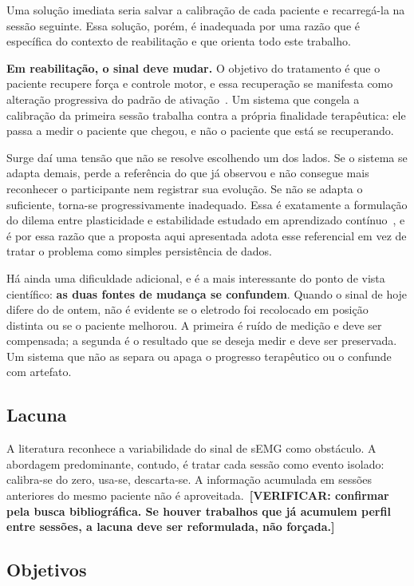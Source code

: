 Uma solução imediata seria salvar a calibração de cada paciente e
recarregá-la na sessão seguinte. Essa solução, porém, é inadequada por
uma razão que é específica do contexto de reabilitação e que orienta
todo este trabalho.

\textbf{Em reabilitação, o sinal deve mudar.} O objetivo do tratamento
é que o paciente recupere força e controle motor, e essa recuperação se
manifesta como alteração progressiva do padrão de
ativação~\cite{ref:recuperacao_motora_semg}. Um sistema que congela a
calibração da primeira sessão trabalha contra a própria finalidade
terapêutica: ele passa a medir o paciente que chegou, e não o paciente
que está se recuperando.

Surge daí uma tensão que não se resolve escolhendo um dos lados. Se o
sistema se adapta demais, perde a referência do que já observou e não
consegue mais reconhecer o participante nem registrar sua evolução. Se
não se adapta o suficiente, torna-se progressivamente inadequado. Essa
é exatamente a formulação do dilema entre plasticidade e estabilidade
estudado em aprendizado contínuo~\cite{ref:aprendizado_continuo}, e é
por essa razão que a proposta aqui apresentada adota esse referencial
em vez de tratar o problema como simples persistência de dados.

Há ainda uma dificuldade adicional, e é a mais interessante do ponto de
vista científico: \textbf{as duas fontes de mudança se confundem}.
Quando o sinal de hoje difere do de ontem, não é evidente se o eletrodo
foi recolocado em posição distinta ou se o paciente melhorou. A
primeira é ruído de medição e deve ser compensada; a segunda é o
resultado que se deseja medir e deve ser preservada. Um sistema que não
as separa ou apaga o progresso terapêutico ou o confunde com artefato.

\subsection{Lacuna}

A literatura reconhece a variabilidade do sinal de sEMG como obstáculo.
A abordagem predominante, contudo, é tratar cada sessão como evento
isolado: calibra-se do zero, usa-se, descarta-se. A informação
acumulada em sessões anteriores do mesmo paciente não é
aproveitada.~\textbf{[VERIFICAR: confirmar pela busca bibliográfica. Se
houver trabalhos que já acumulem perfil entre sessões, a lacuna deve
ser reformulada, não forçada.]}

\subsection{Objetivos}

